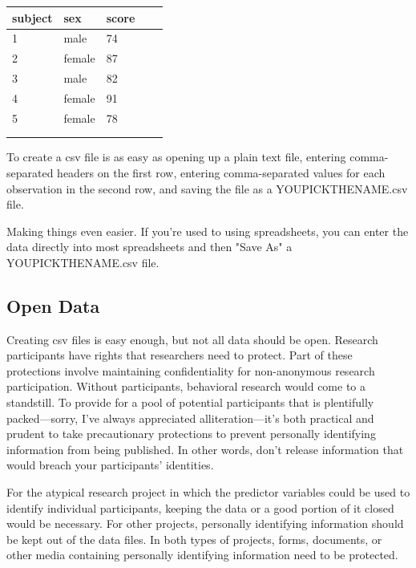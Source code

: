 \documentclass[12pt]{article}
\begin{document}
\begin{center}
    \begin{tabular}{|l|l|l|l|l|}
        \hline
        subject & sex & score & & \\
        \hline
        1 & male & 74 & & \\
        \hline
        2 & female & 87 & & \\
        \hline
        3 & male & 82 & & \\
        \hline
        4 & female & 91 & & \\
        \hline
        5 & female & 78 & & \\
        \hline
         & & & & \\
        \hline
         & & & & \\
        \hline
    \end{tabular}
\end{center}

To create a csv file is as easy as opening up a plain text file, entering comma-separated
headers on the first row, entering comma-separated values for each observation
in the second row, and saving the file as a YOUPICKTHENAME.csv file.

Making things even easier. If you're used to using spreadsheets, you can
enter the data directly into most spreadsheets and then "Save As" a YOUPICKTHENAME.csv file.

\subsection{Open Data}
Creating csv files is easy enough, but not all data should be open. Research participants
have rights that researchers need to protect. Part of these protections involve maintaining
confidentiality for non-anonymous research participation. Without participants, behavioral
research would come to a standstill. To provide for a pool of potential participants that is
plentifully packed---sorry, I've always appreciated alliteration---it's both practical and
prudent to take precautionary protections to prevent personally identifying information from
being published. In other words, don't release information that would breach your participants'
identities.

For the atypical research project in which the predictor variables could be used to identify
individual participants, keeping the data or a good portion of it closed would be necessary.
For other projects, personally identifying information should be kept out of the data files.
In both types of projects, forms, documents, or other media containing personally identifying
information need to be protected.
\end{document}
